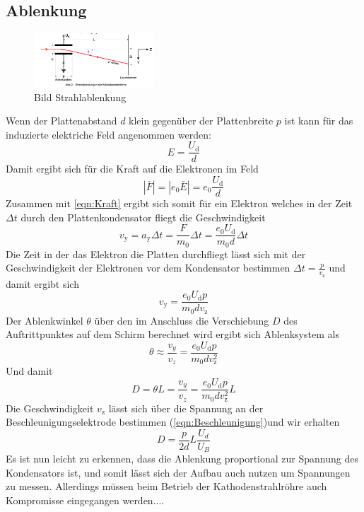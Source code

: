 \subsection{Ablenkung}
\label{sec:Ablenkung}
\begin{figure}[H]
    \centering
    \includegraphics[width=0.4\textwidth]{bilder/Strahlablenkung.png}
    \caption{Bild Strahlablenkung}
    \label{fig:Strahlablenkung}
\end{figure}
Wenn der Plattenabstand $d$ klein gegenüber der Plattenbreite $p$ ist kann für das induzierte elektriche Feld angenommen werden:
\begin{equation*}
    E = \frac{U_{\text{d}}}{d}
\end{equation*}
Damit ergibt sich für die Kraft auf die Elektronen im Feld
\begin{equation}
    |\bar{F}| = |e_0\bar{E}| = e_0 \frac{U_{\text{d}}}{d} \label{eqn:Kraft}
\end{equation}
Zusammen mit \ref{eqn:Kraft} ergibt sich somit für ein Elektron welches in der Zeit $\Delta t$ durch den Plattenkondensator fliegt die Geschwindigkeit
\begin{equation}
    v_{\text{y}} = a_{\text{y}} \Delta t = \frac{F}{m_0}\Delta t = \frac{e_0 U_{\text{d}}}{m_0 d} \Delta t
\end{equation}
Die Zeit in der das Elektron die Platten durchfliegt lässt sich mit der Geschwindigkeit der Elektronen vor dem Kondensator bestimmen $\Delta t = \frac{p}{v_{\text{z}}}$ und damit ergibt sich
\begin{equation}
    v_{\text{y}}  = \frac{e_0 U_{\text{d}} p}{m_0 d v_{\text{z}}} 
\end{equation}
Der Ablenkwinkel $\theta$ über den im Anschluss die Verschiebung $D$ des Auftrittpunktes auf dem Schirm berechnet wird ergibt sich Ablenksystem als 
\begin{equation}
    \theta ≈ \frac{v_y}{v_z} = \frac{e_0 U_{\text{d}} p}{m_0 d v_{\text{z}}^2}
\end{equation}
Und damit
\begin{equation}
    D = \theta L = \frac{v_y}{v_z} = \frac{e_0 U_{\text{d}} p}{m_0 d v_{\text{z}}^2} L
\end{equation}
Die Geschwindigkeit $v_{\text{z}}$ lässt sich über die Spannung an der Beschleunigungselektrode bestimmen (\ref{eqn:Beschleunigung})und wir erhalten
\begin{equation}
    D = \frac{p}{2d}L\frac{U_d}{U_B}
\end{equation}
Es ist nun leicht zu erkennen, dass die Ablenkung proportional zur Spannung des Kondensators ist, und somit lässt sich der Aufbau auch nutzen um Spannungen zu messen.
Allerdings müssen beim Betrieb der Kathodenstrahlröhre auch Kompromisse eingegangen werden.... 
